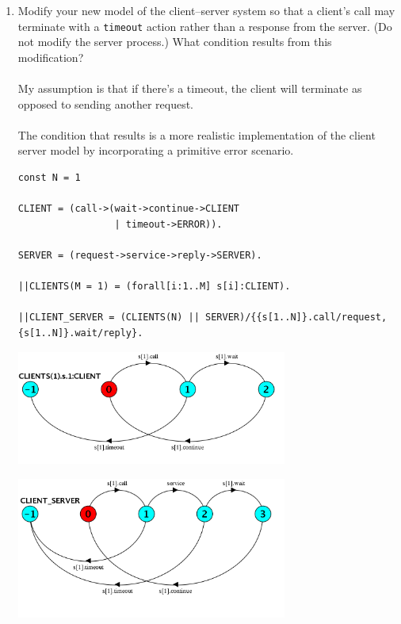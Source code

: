 \documentclass{article}
\begin{document}
\begin{enumerate}
\begin{enumerate}
\item Modify your new model of the client--server system so that a client's call may terminate with a \texttt{timeout} action rather than a response from the server. (Do not modify the server process.) What condition results from this modification? \\
\\
My assumption is that if there's a timeout, the client will terminate as opposed to sending another request. \\
\\
The condition that results is a more realistic implementation of the client server model by incorporating a primitive error scenario. \\
  
\begin{verbatim}
const N = 1

CLIENT = (call->(wait->continue->CLIENT
                 | timeout->ERROR)).                                                    
                                                                                              
SERVER = (request->service->reply->SERVER).                                                   

||CLIENTS(M = 1) = (forall[i:1..M] s[i]:CLIENT). 

||CLIENT_SERVER = (CLIENTS(N) || SERVER)/{{s[1..N]}.call/request, {s[1..N]}.wait/reply}.
\end{verbatim}
\begin{center}
\includegraphics[width=3.5in]{CLIENT_WITH_ERROR_HANDLING.png}
\end{center}
\begin{center}
\includegraphics[width=3.5in]{CLIENT_WITH_ERROR_HANDLING_2.png}
\end{center}

\end{enumerate}
\end{enumerate}
\end{document}
